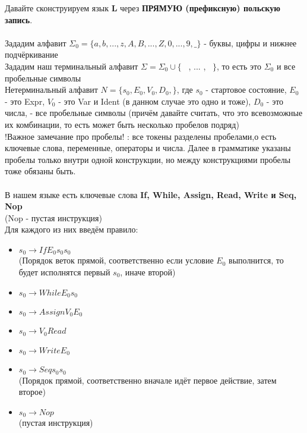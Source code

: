 \documentclass[12pt]{article}
\begin{document}
\pagestyle{fancy}


 Давайте сконструируем язык \textbf{L} через \textbf{ПРЯМУЮ (префиксную) польскую запись}.\\
 \\
 Зададим алфавит $\Sigma_0 = \{a,b,...,z,A,B,...,Z,0,...,9, \_ \}$ - буквы, цифры и нижнее подчёркивание \\
 Зададим наш терминальный алфавит $\Sigma = \Sigma_0 \cup \{$ \ , ... , \ $ \} $, то есть это $\Sigma_0$ и все пробельные символы \\
 Нетерминальный алфавит $N =\{s_0, E_0, V_0, D_0,$\textvisiblespace$  \}$, где $s_0$ - стартовое состояние, $E_0$ - это Expr, $V_0$ - это Var и Ident (в данном случае это одно и тоже), $D_0$ - это числа, \textvisiblespace - все пробельные символы (причём давайте считать, что это всевозможные их комбинации, то есть может быть несколько пробелов подряд) \\
 !Важное замечание про пробелы! : все токены разделены пробелами,о есть ключевые слова, переменные, операторы и числа. Далее в грамматике указаны пробелы только внутри одной конструкции, но между конструкциями пробелы тоже обязаны быть. \\ 
 \\
 В нашем языке есть ключевые слова \textbf{If, While, Assign, Read, Write и Seq, Nop} \\
 (Nop - пустая инструкция) \\
 Для каждого из них введём правило: \\ 
 \begin{itemize}
 	\item $s_0 \to If $\textvisiblespace$ E_0 $\textvisiblespace$ s_0 $\textvisiblespace$ s_0$ \\
 	(Порядок веток прямой, соответственно если условие $E_0$ выполнится, то будет исполнятся первый $s_0$, иначе второй) 
 	\item $s_0 \to While $\textvisiblespace$ E_0 $\textvisiblespace$ s_0 $
 	\item $s_0 \to Assign $\textvisiblespace$V_0 $\textvisiblespace$ E_0 $
 	\item $s_0 \to V_0 $\textvisiblespace$ Read$ 
 	\item $s_0 \to Write $\textvisiblespace$  E_0 $
 	\item $s_0 \to Seq $\textvisiblespace$  s_0 $\textvisiblespace$ s_0 $ \\
 	(Порядок прямой, соответственно вначале идёт первое действие, затем второе) 
 	\item $s_0 \to Nop$ \\ (пустая инструкция)
 \end{itemize}
\end{document}
